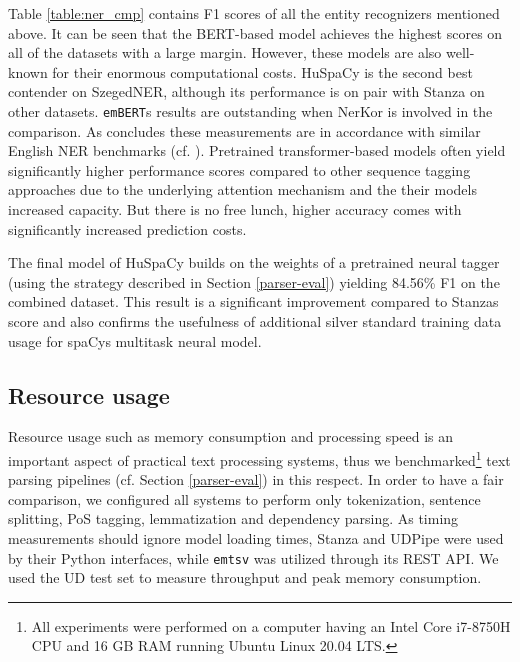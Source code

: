 \documentclass{llncs}
\newcommand{\embert}{\texttt{emBERT}}
\newcommand{\emtsv}{\texttt{emtsv}}
\newcommand{\udpipe}{UDPipe}
\newcommand{\stanza}{Stanza}
\newcommand{\huspacy}{HuSpaCy}
\begin{document}
Table \ref{table:ner_cmp} contains F1 scores of all the entity recognizers mentioned above. 
It can be seen that the BERT-based model achieves the highest scores on all of the datasets with a large margin. However, these models are also well-known for their enormous computational costs. \huspacy{} is the second best contender on SzegedNER, although its performance is on pair with \stanza{} on other datasets. \embert{}\textquotesingle s results are outstanding when NerKor is involved in the comparison. As \citeauthor{nerkor-eval} concludes these measurements are in accordance with similar English NER benchmarks (cf. \cite{stanza}). Pretrained transformer-based models often yield significantly higher performance scores compared to other sequence tagging approaches due to the underlying attention mechanism and the their model\textquotesingle s increased capacity. But there is no free lunch, higher accuracy comes with significantly increased prediction costs. 

The final model of \huspacy{} builds on the weights of a pretrained neural tagger (using the strategy described in Section \ref{parser-eval}) yielding 84.56\% F1 on the combined dataset. This result is a significant improvement compared to \stanza \textquotesingle s score and also confirms the usefulness of additional silver standard training data usage for spaCy\textquotesingle s multitask neural model.

\subsection{Resource usage}
Resource usage such as memory consumption and processing speed is an important aspect of practical text processing systems, thus we benchmarked\footnote{All experiments were performed on a computer having an Intel Core i7-8750H CPU and 16 GB RAM running Ubuntu Linux 20.04 LTS.} text parsing pipelines (cf. Section \ref{parser-eval}) in this respect. In order to have a fair comparison, we configured all systems to perform only tokenization, sentence splitting, PoS tagging, lemmatization and dependency parsing. As timing measurements should ignore model loading times, Stanza and \udpipe{} were used by their Python interfaces, while \emtsv{} was utilized through its REST API. We used the UD test set to measure throughput and peak memory consumption.
\end{document}
